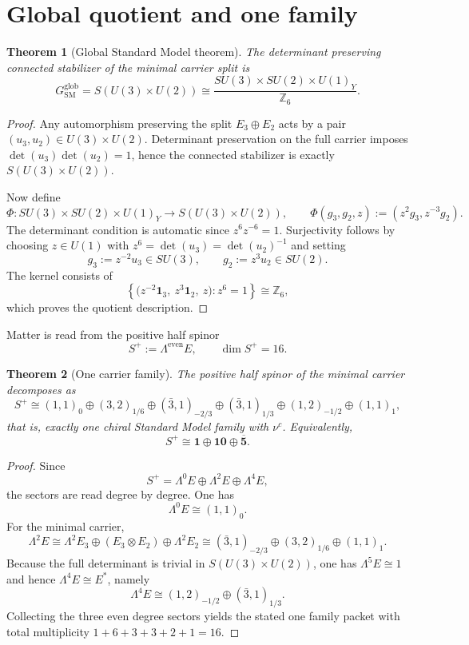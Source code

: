 \documentclass[11pt,a4paper]{article}
\newtheorem{theorem}{Theorem}[section]
\theoremstyle{definition}
\theoremstyle{remark}
\newcommand{\SM}{\mathrm{SM}}
\numberwithin{equation}{section}
\begin{document}
\section{Global quotient and one family}

\begin{theorem}[Global Standard Model theorem]
\label{thm:global-sm}
The determinant preserving connected stabilizer of the minimal carrier split is
\[
G_{\SM}^{\mathrm{glob}}
=
S(U(3)\times U(2))
\cong
\frac{SU(3)\times SU(2)\times U(1)_Y}{\mathbb Z_6}.
\]
\end{theorem}

\begin{proof}
Any automorphism preserving the split $E_3\oplus E_2$ acts by a pair $(u_3,u_2)\in U(3)\times U(2)$.
Determinant preservation on the full carrier imposes $\det(u_3)\det(u_2)=1$, hence the connected
stabilizer is exactly $S(U(3)\times U(2))$.

Now define
\[
\Phi : SU(3)\times SU(2)\times U(1)_Y \longrightarrow S(U(3)\times U(2)),
\qquad
\Phi(g_3,g_2,z) := (z^2 g_3, z^{-3} g_2).
\]
The determinant condition is automatic since $z^6 z^{-6}=1$. Surjectivity follows by choosing
$z\in U(1)$ with $z^6=\det(u_3)=\det(u_2)^{-1}$ and setting
\[
g_3 := z^{-2}u_3 \in SU(3),
\qquad
g_2 := z^3 u_2 \in SU(2).
\]
The kernel consists of
\[
\left\{
\bigl(z^{-2}\mathbf 1_3,\ z^3\mathbf 1_2,\ z\bigr): z^6=1
\right\}
\cong \mathbb Z_6,
\]
which proves the quotient description.
\end{proof}

Matter is read from the positive half spinor
\[
S^+ := \Lambda^{\mathrm{even}}E,
\qquad
\dim S^+ = 16.
\]

\begin{theorem}[One carrier family]
\label{thm:one-family}
The positive half spinor of the minimal carrier decomposes as
\[
S^+
\cong
(1,1)_0\oplus(3,2)_{1/6}\oplus(\bar 3,1)_{-2/3}\oplus(\bar 3,1)_{1/3}\oplus(1,2)_{-1/2}\oplus(1,1)_1,
\]
that is, exactly one chiral Standard Model family with $\nu^c$. Equivalently,
\[
S^+ \cong \mathbf 1 \oplus \mathbf{10} \oplus \overline{\mathbf 5}.
\]
\end{theorem}

\begin{proof}
Since
\[
S^+ = \Lambda^0E \oplus \Lambda^2E \oplus \Lambda^4E,
\]
the sectors are read degree by degree. One has
\[
\Lambda^0E \cong (1,1)_0.
\]
For the minimal carrier,
\[
\Lambda^2E
\cong
\Lambda^2E_3 \oplus (E_3\otimes E_2)\oplus \Lambda^2E_2
\cong
(\bar 3,1)_{-2/3}\oplus(3,2)_{1/6}\oplus(1,1)_1.
\]
Because the full determinant is trivial in $S(U(3)\times U(2))$, one has $\Lambda^5E\cong 1$ and
hence $\Lambda^4E\cong E^\ast$, namely
\[
\Lambda^4E \cong (1,2)_{-1/2}\oplus(\bar 3,1)_{1/3}.
\]
Collecting the three even degree sectors yields the stated one family packet with total
multiplicity $1+6+3+3+2+1=16$.
\end{proof}
\end{document}
